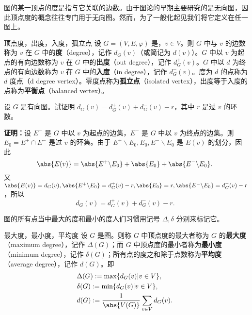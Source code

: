 

图的某一顶点的度是指与它关联的边数。由于图论的早期主要研究的是无向图，因此顶点度的概念往往专门用于无向图。然而，为了一般化起见我们将它定义在任一图上。

\begin{definition}{顶点度，出度，入度，孤立点}
设 $G=(V,E,\varphi)$ 是，$v\in V$。则 $G$ 中与 $v$ 的边数称为 $v$ 在 $G$ 中的\textbf{度}（degree），记作 $d_G(v)$（或简记为 $d(v)$）。$G$ 中以 $v$ 为起点的有向边数称为 $v$ 在 $G$ 中的\textbf{出度}（out degree），记作 $d_G^+(v)$。$G$ 中以 $d$ 为终点的有向边数称为 $v$ 在 $G$ 中的\textbf{入度}（in degree），记作 $d_G^-(v)$。度为 $d$ 的点称为 $d$ 度点（d degree vertex）。零度点称为\textbf{孤立点}（isolated vertex），出度等于入度的点称为\textbf{平衡点}（balanced vertex）。
\end{definition}

\begin{example}{}
设 $G$ 是有向图。试证明 $d_G(v)=d_G^+(v)+d_G^-(v)-r$，其中 $r$ 是过 $v$ 的环数。

\textbf{证明：}设 $E^+$ 是 $G$ 中以 $v$ 为起点的边集，$E^-$ 是 $G$ 中以 $v$ 为终点的边集。则 $E_0=E^+\cap E^-$ 是过 $v$ 的环集。由于
$E^+\backslash E_0, E_0, E^-\backslash E_0$ 是 $E(v)$ 的划分，因此
\begin{equation}
\abs{E(v)}=\abs{E^+\backslash E_0}+\abs{E_0}+\abs{E^-\backslash E_0}.~
\end{equation}
又 $\abs{E(v)}=d_G(v),\abs{E^+\backslash E_0}=d_G^+(v)-r, \abs{E_0}=r, \abs{E^-\backslash E_0}=d_G^-(v)-r$，所以
\begin{equation}
d_G(v)=d_G^+(v)+d_G^-(v)-r.~
\end{equation}
\end{example}
图的所有点当中最大的度和最小的度人们习惯用记号 $\Delta,\delta$ 分别来标记它。
\begin{definition}{最大度，最小度，平均度}
设 $G$ 是图。则称 $G$ 中顶点度的最大者称为 $G$ 的\textbf{最大度}（maximum degree），记作 $\Delta(G)$；而 $G$ 中顶点度的最小者称为\textbf{最小度}（minimum degree），记作 $\delta(G)$；所有点的度之和除于点数称为\textbf{平均度}（average degree），记作 $d(G)$。即
\begin{equation}\label{eq_DGraph_2}
\begin{aligned}
&\Delta(G):=\max\{d_G(v)|v\in V\}, \\
&\delta(G):=\min\{d_G(v)|v\in V\},\\
&d(G):=\frac{1}{\abs{V(G)}}\sum_{v\in V}d_G(v).
\end{aligned}~
\end{equation}
\end{definition}

